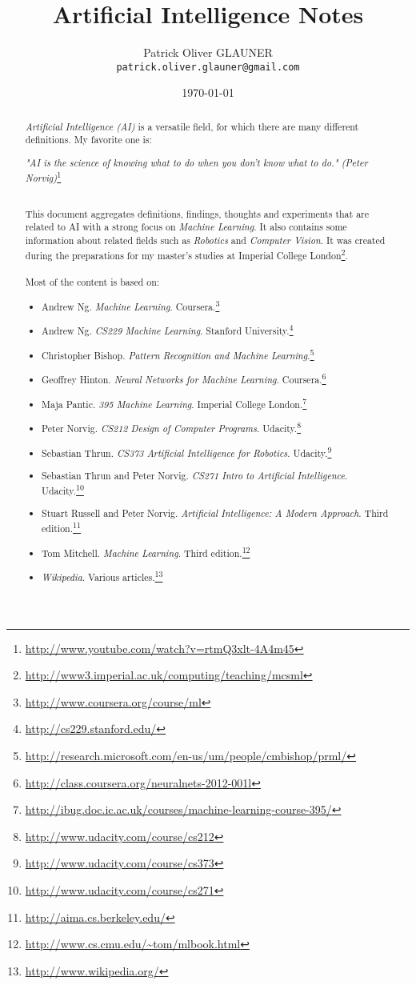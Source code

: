\documentclass{report}
\title{Artificial Intelligence Notes}
\author{Patrick Oliver GLAUNER \\
	\texttt{patrick.oliver.glauner@gmail.com}}
\date{\today}
\begin{document}
\maketitle

\tableofcontents

\begin{abstract}
{\em Artificial Intelligence (AI)} is a versatile field, for which there are many different definitions. My favorite one is:
\begin{flushright}
{\em "AI is the science of knowing what to do when you don't know what to do." (Peter Norvig)}\footnote{\url{http://www.youtube.com/watch?v=rtmQ3xlt-4A4m45}}
\end{flushright}
~\\
This document aggregates definitions, findings, thoughts and experiments that are related to AI with a strong focus on {\em Machine Learning}. It also contains some information about related fields such as {\em Robotics} and {\em Computer Vision}.
It was created during the preparations for my master's studies at Imperial College London\footnote{\url{http://www3.imperial.ac.uk/computing/teaching/mcsml}}.
~\\~\\
Most of the content is based on:
\begin{itemize}
\item Andrew Ng. {\em Machine Learning}. Coursera.\footnote{\url{http://www.coursera.org/course/ml}}
\item Andrew Ng. {\em CS229 Machine Learning}. Stanford University.\footnote{\url{http://cs229.stanford.edu/}}
\item Christopher Bishop. {\em Pattern Recognition and Machine Learning}.\footnote{\url{http://research.microsoft.com/en-us/um/people/cmbishop/prml/}}
\item Geoffrey Hinton. {\em Neural Networks for Machine Learning}. Coursera.\footnote{\url{http://class.coursera.org/neuralnets-2012-001l}}
\item Maja Pantic. {\em 395 Machine Learning}. Imperial College London.\footnote{\url{http://ibug.doc.ic.ac.uk/courses/machine-learning-course-395/}}
\item Peter Norvig. {\em CS212 Design of Computer Programs}. Udacity.\footnote{\url{http://www.udacity.com/course/cs212}}
\item Sebastian Thrun. {\em CS373 Artificial Intelligence for Robotics}. Udacity.\footnote{\url{http://www.udacity.com/course/cs373}}
\item Sebastian Thrun and Peter Norvig. {\em CS271 Intro to Artificial Intelligence}. Udacity.\footnote{\url{http://www.udacity.com/course/cs271}}
\item Stuart Russell and Peter Norvig. {\em Artificial Intelligence: A Modern Approach}. Third edition.\footnote{\url{http://aima.cs.berkeley.edu/}}
\item Tom Mitchell. {\em Machine Learning}. Third edition.\footnote{\url{http://www.cs.cmu.edu/~tom/mlbook.html}}
\item {\em Wikipedia}. Various articles.\footnote{\url{http://www.wikipedia.org/}}
\end{itemize}


\end{abstract}
\end{document}
